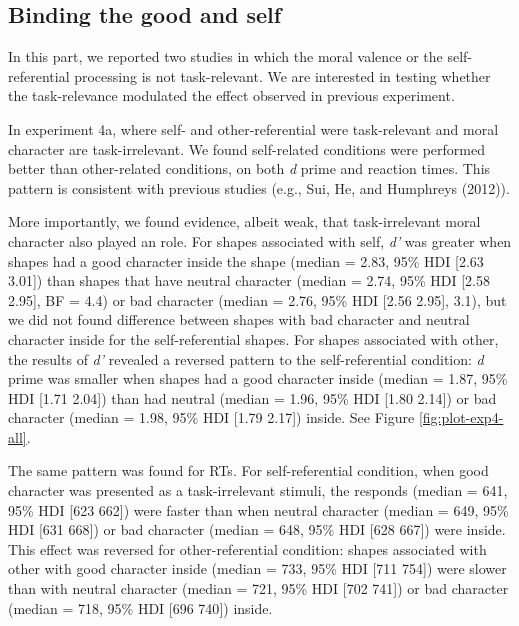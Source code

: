 \documentclass[
  english,
  man]{apa6}
\begin{document}
\hypertarget{binding-the-good-and-self}{%
\subsection{Binding the good and self}\label{binding-the-good-and-self}}

In this part, we reported two studies in which the moral valence or the self-referential processing is not task-relevant. We are interested in testing whether the task-relevance modulated the effect observed in previous experiment.

In experiment 4a, where self- and other-referential were task-relevant and moral character are task-irrelevant. We found self-related conditions were performed better than other-related conditions, on both \emph{d} prime and reaction times. This pattern is consistent with previous studies (e.g., Sui, He, and Humphreys (2012)).

More importantly, we found evidence, albeit weak, that task-irrelevant moral character also played an role. For shapes associated with self, \emph{d'} was greater when shapes had a good character inside the shape (median = 2.83, 95\% HDI {[}2.63 3.01{]}) than shapes that have neutral character (median = 2.74, 95\% HDI {[}2.58 2.95{]}, BF = 4.4) or bad character (median = 2.76, 95\% HDI {[}2.56 2.95{]}, 3.1), but we did not found difference between shapes with bad character and neutral character inside for the self-referential shapes. For shapes associated with other, the results of \emph{d'} revealed a reversed pattern to the self-referential condition: \emph{d} prime was smaller when shapes had a good character inside (median = 1.87, 95\% HDI {[}1.71 2.04{]}) than had neutral (median = 1.96, 95\% HDI {[}1.80 2.14{]}) or bad character (median = 1.98, 95\% HDI {[}1.79 2.17{]}) inside. See Figure \ref{fig:plot-exp4-all}.

The same pattern was found for RTs. For self-referential condition, when good character was presented as a task-irrelevant stimuli, the responds (median = 641, 95\% HDI {[}623 662{]}) were faster than when neutral character (median = 649, 95\% HDI {[}631 668{]}) or bad character (median = 648, 95\% HDI {[}628 667{]}) were inside. This effect was reversed for other-referential condition: shapes associated with other with good character inside (median = 733, 95\% HDI {[}711 754{]}) were slower than with neutral character (median = 721, 95\% HDI {[}702 741{]}) or bad character (median = 718, 95\% HDI {[}696 740{]}) inside.
\end{document}

